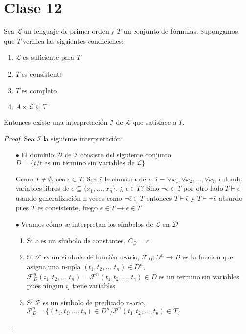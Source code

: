 \section{Clase 12}

\begin{theorem}
Sea $\mathcal{L}$ un lenguaje de primer orden y $T$ un conjunto de f\'ormulas. Supongamos que $T$ verifica las siguientes condiciones:

\begin{enumerate}
    \item $\mathcal{L}$ es suficiente para $T$
    \item $T$ es consistente
    \item $T$ es completo
    \item $A \times \mathcal{L} \subseteq T$
\end{enumerate}

Entonces existe una interpretaci\'on $\mathcal{I}$ de $\mathcal{L}$ que satisface a $T$.
\end{theorem}

\begin{proof}
Sea $\mathcal{I}$ la siguiente interpretaci\'on:

\begin{enumerate}
    \item[$\bullet$] El dominio $\mathcal{D}$ de $\mathcal{I}$ consiste del siguiente conjunto $D = \{ t / \text{t es un t\'ermino sin variables de } \mathcal{L} \} $
    
    \begin{observation}
    Como $T \neq \emptyset$, sea $\epsilon \in T$. Sea $\bar{\epsilon}$ la clausura de $\epsilon$. $\bar{\epsilon} = \forall x_1, \forall x_2, \ldots, \forall x_n$ $\epsilon$ donde variables libres de $\epsilon \subseteq \{ x_1, \ldots, x_n \}$. ¿ $\bar{\epsilon} \in T$? Sino $\neg \bar{\epsilon} \in T$ por otro lado $T \vdash \bar{\epsilon}$ usando generalizaci\'on n-veces como $\neg \bar{\epsilon} \in T$ entonces $T \vdash \bar{\epsilon}$ y $T \vdash \neg \bar{\epsilon}$ absurdo pues $T$ es consistente, luego $\epsilon \in T \rightarrow \bar{\epsilon} \in T$
    \end{observation}
    \item[$\bullet$] Veamos c\'omo se interpretan los s\'imbolos de $\mathcal{L}$ en $\mathcal{D}$
        \begin{enumerate}
            \item Si $c$ es un s\'imbolo de constantes, $C_{D} = c$
            \item Si $\mathcal{F}$ es un s\'imbolo de funci\'on n-ario, $\mathcal{F}_{D} \colon D^n \rightarrow D$ es la funcion que asigna una n-upla $(t_1, t_2, \ldots, t_n) \in D^n$, $\mathcal{F}_{D}^{n}(t_1, t_2, \ldots, t_n) = \mathcal{F}^{n}(t_1, t_2, \ldots, t_n) \in D$ es un termino sin variables pues ningun $t_i$ tiene variables.
            \item Si $\mathcal{P}$ es un s\'imbolo de predicado n-ario, $\mathcal{P}_{D}^{n} = \{ (t_1, t_2, \ldots, t_n) \in D^n / \mathcal{P}^{n} (t_1, t_2, \ldots, t_n) \in T \}$
        \end{enumerate}
\end{enumerate}
\end{proof}


